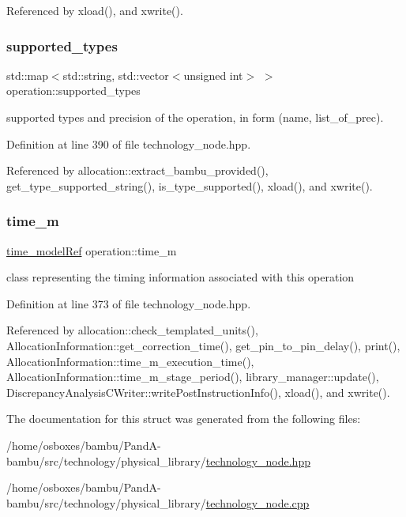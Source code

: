 Referenced by xload(), and xwrite().

\mbox{\label{structoperation_aaf4ee4678115f720880e7788a4b9be26}} 
\subsubsection{\texorpdfstring{supported\+\_\+types}{supported\_types}}
{\footnotesize\ttfamily std\+::map$<$std\+::string, std\+::vector$<$unsigned int$>$ $>$ operation\+::supported\+\_\+types}



supported types and precision of the operation, in form (name, list\+\_\+of\+\_\+prec). 



Definition at line 390 of file technology\+\_\+node.\+hpp.



Referenced by allocation\+::extract\+\_\+bambu\+\_\+provided(), get\+\_\+type\+\_\+supported\+\_\+string(), is\+\_\+type\+\_\+supported(), xload(), and xwrite().

\mbox{\label{structoperation_a95c5d7de70dde9a2bc866123b301c154}} 
\subsubsection{\texorpdfstring{time\+\_\+m}{time\_m}}
{\footnotesize\ttfamily \hyperlink{time__model_8hpp_ae203bb7faf1c278333f76fcc6ebe412c}{time\+\_\+model\+Ref} operation\+::time\+\_\+m}



class representing the timing information associated with this operation 



Definition at line 373 of file technology\+\_\+node.\+hpp.



Referenced by allocation\+::check\+\_\+templated\+\_\+units(), Allocation\+Information\+::get\+\_\+correction\+\_\+time(), get\+\_\+pin\+\_\+to\+\_\+pin\+\_\+delay(), print(), Allocation\+Information\+::time\+\_\+m\+\_\+execution\+\_\+time(), Allocation\+Information\+::time\+\_\+m\+\_\+stage\+\_\+period(), library\+\_\+manager\+::update(), Discrepancy\+Analysis\+C\+Writer\+::write\+Post\+Instruction\+Info(), xload(), and xwrite().



The documentation for this struct was generated from the following files\+:\begin{DoxyCompactItemize}
\item 
/home/osboxes/bambu/\+Pand\+A-\/bambu/src/technology/physical\+\_\+library/\hyperlink{technology__node_8hpp}{technology\+\_\+node.\+hpp}\item 
/home/osboxes/bambu/\+Pand\+A-\/bambu/src/technology/physical\+\_\+library/\hyperlink{technology__node_8cpp}{technology\+\_\+node.\+cpp}\end{DoxyCompactItemize}
